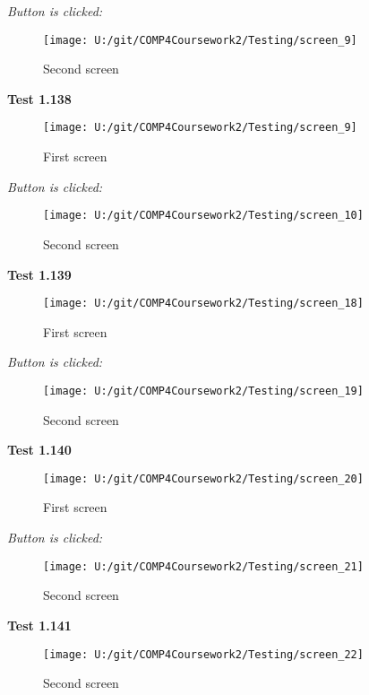 \textit{Button is clicked: }

\begin{figure}[H]
    \label{fig: Second Screen}\caption{Second screen}
    \texttt{[image: U:/git/COMP4Coursework2/Testing/screen\_9]}
\end{figure}

\textbf{Test 1.138}

\begin{figure}[H]
    \label{fig: First Screen}\caption{First screen}
    \texttt{[image: U:/git/COMP4Coursework2/Testing/screen\_9]}
\end{figure}

\textit{Button is clicked: }

\begin{figure}[H]
    \label{fig: Second Screen}\caption{Second screen}
    \texttt{[image: U:/git/COMP4Coursework2/Testing/screen\_10]}
\end{figure}

\textbf{Test 1.139}

\begin{figure}[H]
    \label{fig: First Screen}\caption{First screen}
    \texttt{[image: U:/git/COMP4Coursework2/Testing/screen\_18]}
\end{figure}

\textit{Button is clicked: }

\begin{figure}[H]
    \label{fig: Second Screen}\caption{Second screen}
    \texttt{[image: U:/git/COMP4Coursework2/Testing/screen\_19]}
\end{figure}

\textbf{Test 1.140}

\begin{figure}[H]
    \label{fig: First Screen}\caption{First screen}
    \texttt{[image: U:/git/COMP4Coursework2/Testing/screen\_20]}
\end{figure}

\textit{Button is clicked: }

\begin{figure}[H]
    \label{fig: Second Screen}\caption{Second screen}
    \texttt{[image: U:/git/COMP4Coursework2/Testing/screen\_21]}
\end{figure}

\textbf{Test 1.141}

\begin{figure}[H]
    \label{fig: Second Screen}\caption{Second screen}
    \texttt{[image: U:/git/COMP4Coursework2/Testing/screen\_22]}
\end{figure}

